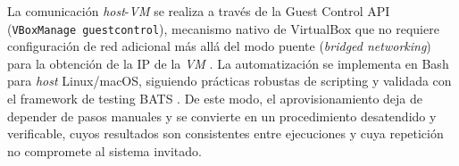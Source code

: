 \documentclass[12pt,letterpaper]{article}
\newcommand{\vm}{\textit{VM}}
\newcommand{\host}{\textit{host}}
\begin{document}
La comunicación \host{}-\vm{} se realiza a través de la Guest Control API (\texttt{VBoxManage guestcontrol}), mecanismo nativo de VirtualBox que no requiere configuración de red adicional más allá del modo puente (\textit{bridged networking}) para la obtención de la IP de la \vm{} \parencite{virtualbox_guestcontrol, virtualbox_networking}. La automatización se implementa en Bash para \host{} Linux/macOS, siguiendo prácticas robustas de scripting \parencite{bash_best_practices, shellcheck} y validada con el framework de testing BATS \parencite{bats_testing}. De este modo, el aprovisionamiento deja de depender de pasos manuales y se convierte en un procedimiento desatendido y verificable, cuyos resultados son consistentes entre ejecuciones y cuya repetición no compromete al sistema invitado.








\newpage
\printbibliography
\end{document}
